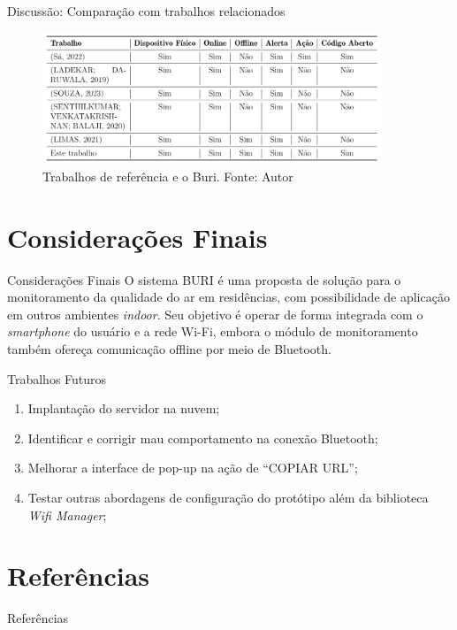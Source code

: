 \documentclass[12pt]{beamer}
\begin{document}
    \begin{frame}{Discussão: Comparação com trabalhos relacionados}
        \begin{figure}[ht]
            \centering
            \includegraphics[width=0.90\textwidth]{./img/comparacao-trabalho.png}
            \caption{Trabalhos de referência e o Buri. Fonte: Autor}\label{fig:buriTRab}
        \end{figure}
    \end{frame}

    \section{Considerações Finais}

    \begin{frame}{Considerações Finais}
        O sistema BURI é uma proposta de solução para o monitoramento da qualidade do
        ar em residências, com possibilidade de aplicação em outros ambientes \textit{indoor}. Seu objetivo é
        operar de forma integrada com o \textit{smartphone} do usuário e a rede Wi-Fi, embora o módulo de
        monitoramento também ofereça comunicação offline por meio de Bluetooth. 
    \end{frame}

    \begin{frame}{Trabalhos Futuros}
        \begin{enumerate}
            \item Implantação do servidor na nuvem;
            \item Identificar e corrigir mau comportamento na conexão Bluetooth;
            \item Melhorar a interface de pop-up na ação de ``COPIAR URL'';
            \item Testar outras abordagens de configuração do protótipo além da biblioteca \textit{Wifi Manager};
        \end{enumerate}
    \end{frame}

    \section{Referências}

    \begin{frame}{Referências}
    
    \end{frame}
    
    \printbibliography
\end{document}
